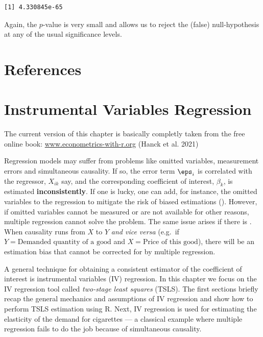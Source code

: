 \documentclass[
  letterpaper,
  DIV=11,
  numbers=noendperiod]{scrreprt}
\theoremstyle{definition}
\theoremstyle{plain}
\theoremstyle{plain}
\theoremstyle{remark}
\begin{document}
{\begin{verbatim}
[1] 4.330845e-65
\end{verbatim}

Again, the \(p\)-value is very small and allows us to reject the (false)
null-hypothesis at any of the usual significance levels.


\hypertarget{references-2}{%
\chapter*{References}\label{references-2}}


\hypertarget{ivr}{%
\chapter{Instrumental Variables Regression}\label{ivr}}

The current version of this chapter is basically completly taken from
the free online book: \url{www.econometrics-with-r.org} (Hanck et al.
2021)

\bigskip

Regression models may suffer from problems like omitted variables,
measurement errors and simultaneous causality. If so, the error term
\(\eps_i\) is correlated with the regressor, \(X_{ik}\) say, and the
corresponding coefficient of interest, \(\beta_k\), is estimated
\textbf{inconsistently}. If one is lucky, one can add, for instance, the
omitted variables to the regression to mitigate the risk of biased
estimations (). However, if omitted
variables cannot be measured or are not available for other reasons,
multiple regression cannot solve the problem. The same issue arises if
there is . When causality runs from \(X\) to
\(Y\) \emph{and vice versa} (e.g.~if
\(Y=\text{Demanded quantity of a good}\) and
\(X=\text{Price of this good}\)), there will be an estimation bias that
cannot be corrected for by multiple regression.

A general technique for obtaining a consistent estimator of the
coefficient of interest is instrumental variables (IV) regression. In
this chapter we focus on the IV regression tool called \emph{two-stage
least squares} (TSLS). The first sections briefly recap the general
mechanics and assumptions of IV regression and show how to perform TSLS
estimation using \textsf{R}. Next, IV regression is used for estimating
the elasticity of the demand for cigarettes --- a classical example
where multiple regression fails to do the job because of simultaneous
causality.

}
\end{document}
